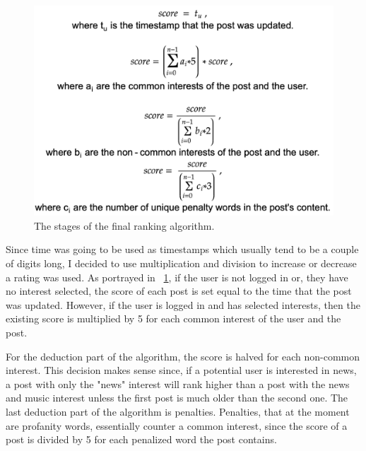 \begin{figure}[htbp]
\begin{minipage}[t]{\linewidth}
  \centering
    \includegraphics[scale=0.4]{Figures/algorithm}
    \caption{The stages of the final ranking algorithm.}
    \label{fig:algorithm}
\end{minipage}%
\end{figure}


Since time was going to be used as timestamps which usually tend to be a couple of digits long, I decided to use multiplication and division to increase or decrease a rating was used. As portrayed in ~\ref{fig:algorithm}, if the user is not logged in or, they have no interest selected, the score of each post is set equal to the time that the post was updated. However, if the user is logged in and has selected interests, then the existing score is multiplied by 5 for each common interest of the user and the post.

For the deduction part of the algorithm, the score is halved for each non-common interest. This decision makes sense since, if a potential user is interested in news, a post with only the "news" interest will rank higher than a post with the news and music interest unless the first post is much older than the second one. The last deduction part of the algorithm is penalties. Penalties, that at the moment are profanity words, essentially counter a common interest, since the score of a post is divided by 5 for each penalized word the post contains.

